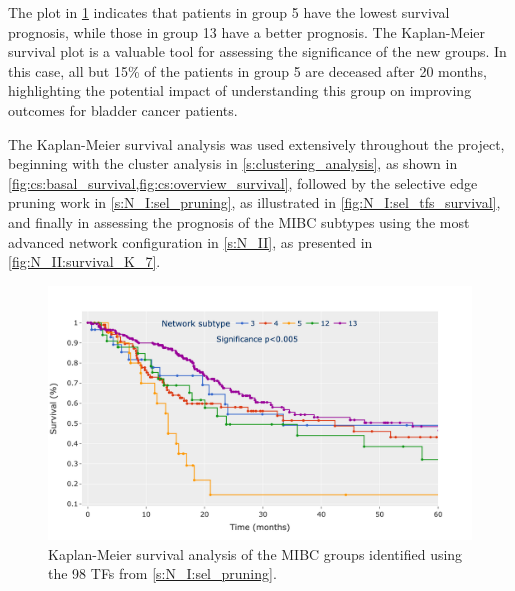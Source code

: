 The plot in \cref{fig:lit:surival_eg} indicates that patients in group 5 have the lowest survival prognosis, while those in group 13 have a better prognosis. The Kaplan-Meier survival plot is a valuable tool for assessing the significance of the new groups. In this case, all but 15\% of the patients in group 5 are deceased after 20 months, highlighting the potential impact of understanding this group on improving outcomes for bladder cancer patients.

The Kaplan-Meier survival analysis was used extensively throughout the project, beginning with the cluster analysis in \cref{s:clustering_analysis}, as shown in \cref{fig:cs:basal_survival,fig:cs:overview_survival}, followed by the selective edge pruning work in \cref{s:N_I:sel_pruning}, as illustrated in \cref{fig:N_I:sel_tfs_survival}, and finally in assessing the prognosis of the MIBC subtypes using the most advanced network configuration in \cref{s:N_II}, as presented in \cref{fig:N_II:survival_K_7}.


\begin{figure}[!htb]
    \centering
    \includegraphics[width=1.0\textwidth,height=1.0\textheight,keepaspectratio]
    {Sections/Network_I/Resources/selective_pruning/survival_sel_tfs_cs.png}
    \caption{Kaplan-Meier survival analysis of the MIBC groups identified using the 98 TFs from \cref{s:N_I:sel_pruning}.}
    \label{fig:lit:surival_eg}
\end{figure}
